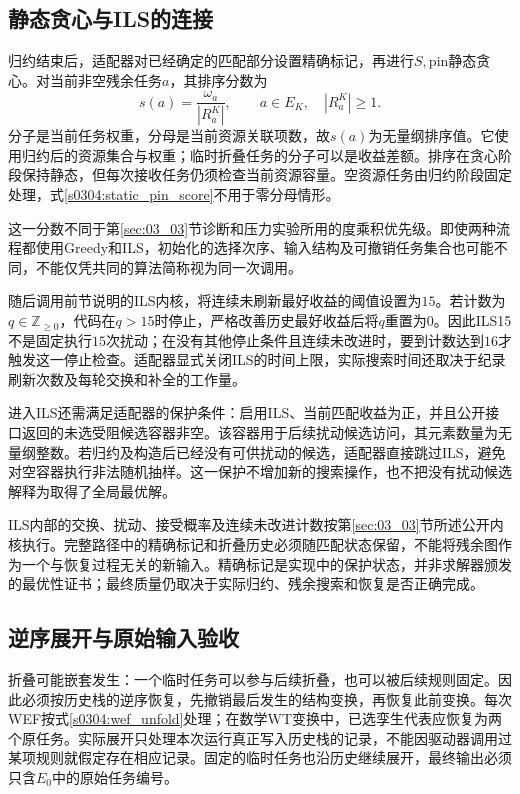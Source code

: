 \subsection{静态贪心与ILS的连接}

归约结束后，适配器对已经确定的匹配部分设置精确标记，再进行$S,\mathrm{pin}$静态贪心。对当前非空残余任务$a$，其排序分数为
\begin{equation}
 s(a)=\frac{\omega_a}{|R_a^K|},
 \qquad a\in E_K,\quad |R_a^K|\geq1.
 \label{s0304:static_pin_score}
\end{equation}
分子是当前任务权重，分母是当前资源关联项数，故$s(a)$为无量纲排序值。它使用归约后的资源集合与权重；临时折叠任务的分子可以是收益差额。排序在贪心阶段保持静态，但每次接收任务仍须检查当前资源容量。空资源任务由归约阶段固定处理，式\eqref{s0304:static_pin_score}不用于零分母情形。

这一分数不同于第\ref{sec:03_03}节诊断和压力实验所用的度乘积优先级。即使两种流程都使用Greedy和ILS，初始化的选择次序、输入结构及可撤销任务集合也可能不同，不能仅凭共同的算法简称视为同一次调用。

随后调用前节说明的ILS内核，将连续未刷新最好收益的阈值设置为$15$。若计数为$q\in\mathbb{Z}_{\geq0}$，代码在$q>15$时停止，严格改善历史最好收益后将$q$重置为$0$。因此ILS15不是固定执行$15$次扰动；在没有其他停止条件且连续未改进时，要到计数达到$16$才触发这一停止检查。适配器显式关闭ILS的时间上限，实际搜索时间还取决于纪录刷新次数及每轮交换和补全的工作量。

进入ILS还需满足适配器的保护条件：启用ILS、当前匹配收益为正，并且公开接口返回的未选受阻候选容器非空。该容器用于后续扰动候选访问，其元素数量为无量纲整数。若归约及构造后已经没有可供扰动的候选，适配器直接跳过ILS，避免对空容器执行非法随机抽样。这一保护不增加新的搜索操作，也不把没有扰动候选解释为取得了全局最优解。

ILS内部的交换、扰动、接受概率及连续未改进计数按第\ref{sec:03_03}节所述公开内核执行。完整路径中的精确标记和折叠历史必须随匹配状态保留，不能将残余图作为一个与恢复过程无关的新输入。精确标记是实现中的保护状态，并非求解器颁发的最优性证书；最终质量仍取决于实际归约、残余搜索和恢复是否正确完成。

\subsection{逆序展开与原始输入验收}

折叠可能嵌套发生：一个临时任务可以参与后续折叠，也可以被后续规则固定。因此必须按历史栈的逆序恢复，先撤销最后发生的结构变换，再恢复此前变换。每次WEF按式\eqref{s0304:wef_unfold}处理；在数学WT变换中，已选孪生代表应恢复为两个原任务。实际展开只处理本次运行真正写入历史栈的记录，不能因驱动器调用过某项规则就假定存在相应记录。固定的临时任务也沿历史继续展开，最终输出必须只含$E_0$中的原始任务编号。

